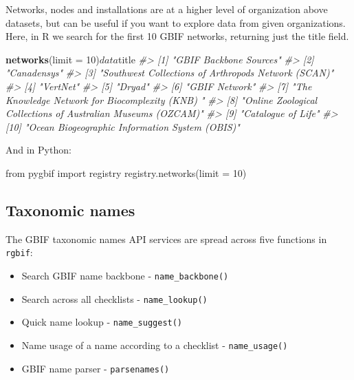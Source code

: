 \documentclass[author-year, review, 11pt]{components/elsarticle} %
\newenvironment{Shaded}{\begin{snugshade}}{\end{snugshade}}
\newcommand{\KeywordTok}[1]{\textcolor[rgb]{0.13,0.29,0.53}{\textbf{{#1}}}}
\newcommand{\DataTypeTok}[1]{\textcolor[rgb]{0.13,0.29,0.53}{{#1}}}
\newcommand{\DecValTok}[1]{\textcolor[rgb]{0.00,0.00,0.81}{{#1}}}
\newcommand{\CharTok}[1]{\textcolor[rgb]{0.31,0.60,0.02}{{#1}}}
\newcommand{\CommentTok}[1]{\textcolor[rgb]{0.56,0.35,0.01}{\textit{{#1}}}}
\newcommand{\NormalTok}[1]{{#1}}
\begin{document}
Networks, nodes and installations are at a higher level of organization
above datasets, but can be useful if you want to explore data from given
organizations. Here, in R we search for the first 10 GBIF networks,
returning just the title field.

\begin{Shaded}
\begin{Highlighting}[]
\KeywordTok{networks}\NormalTok{(}\DataTypeTok{limit =} \DecValTok{10}\NormalTok{)$data$title}
\CommentTok{#>  [1] "GBIF Backbone Sources"                                      }
\CommentTok{#>  [2] "Canadensys"                                                 }
\CommentTok{#>  [3] "Southwest Collections of Arthropods Network (SCAN)"         }
\CommentTok{#>  [4] "VertNet"                                                    }
\CommentTok{#>  [5] "Dryad"                                                      }
\CommentTok{#>  [6] "GBIF Network"                                               }
\CommentTok{#>  [7] "The Knowledge Network for Biocomplexity (KNB) "             }
\CommentTok{#>  [8] "Online Zoological Collections of Australian Museums (OZCAM)"}
\CommentTok{#>  [9] "Catalogue of Life"                                          }
\CommentTok{#> [10] "Ocean Biogeographic Information System (OBIS)"}
\end{Highlighting}
\end{Shaded}

And in Python:

\begin{Shaded}
\begin{Highlighting}[]
\CharTok{from} \NormalTok{pygbif }\CharTok{import} \NormalTok{registry}
\NormalTok{registry.networks(limit = }\DecValTok{10}\NormalTok{)}
\end{Highlighting}
\end{Shaded}

\subsection{Taxonomic names}\label{taxonomic-names}

The GBIF taxonomic names API services are spread across five functions
in \texttt{rgbif}:

\begin{itemize}
\itemsep1pt\parskip0pt
\item
  Search GBIF name backbone - \texttt{name\_backbone()}
\item
  Search across all checklists - \texttt{name\_lookup()}
\item
  Quick name lookup - \texttt{name\_suggest()}
\item
  Name usage of a name according to a checklist - \texttt{name\_usage()}
\item
  GBIF name parser - \texttt{parsenames()}
\end{itemize}
\end{document}
